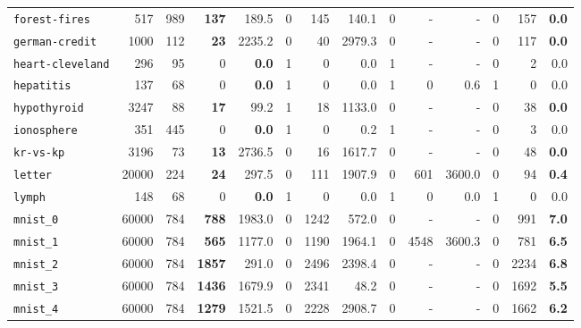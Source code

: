 \begin{tabular}{lccrrrrrrrrrrr}
\texttt{forest-fires} & \multicolumn{1}{r}{517} & \multicolumn{1}{r}{989}  & \textbf{137} & 189.5 & 0 & 145 & 140.1 & 0 & - & - & 0 & 157 & \textbf{0.0}\\
\texttt{german-credit} & \multicolumn{1}{r}{1000} & \multicolumn{1}{r}{112}  & \textbf{23} & 2235.2 & 0 & 40 & 2979.3 & 0 & - & - & 0 & 117 & \textbf{0.0}\\
\texttt{heart-cleveland} & \multicolumn{1}{r}{296} & \multicolumn{1}{r}{95}  & 0 & \textbf{0.0} & 1 & 0 & 0.0 & 1 & - & - & 0 & 2 & 0.0\\
\texttt{hepatitis} & \multicolumn{1}{r}{137} & \multicolumn{1}{r}{68}  & 0 & \textbf{0.0} & 1 & 0 & 0.0 & 1 & 0 & 0.6 & 1 & 0 & 0.0\\
\texttt{hypothyroid} & \multicolumn{1}{r}{3247} & \multicolumn{1}{r}{88}  & \textbf{17} & 99.2 & 1 & 18 & 1133.0 & 0 & - & - & 0 & 38 & \textbf{0.0}\\
\texttt{ionosphere} & \multicolumn{1}{r}{351} & \multicolumn{1}{r}{445}  & 0 & \textbf{0.0} & 1 & 0 & 0.2 & 1 & - & - & 0 & 3 & 0.0\\
\texttt{kr-vs-kp} & \multicolumn{1}{r}{3196} & \multicolumn{1}{r}{73}  & \textbf{13} & 2736.5 & 0 & 16 & 1617.7 & 0 & - & - & 0 & 48 & \textbf{0.0}\\
\texttt{letter} & \multicolumn{1}{r}{20000} & \multicolumn{1}{r}{224}  & \textbf{24} & 297.5 & 0 & 111 & 1907.9 & 0 & 601 & 3600.0 & 0 & 94 & \textbf{0.4}\\
\texttt{lymph} & \multicolumn{1}{r}{148} & \multicolumn{1}{r}{68}  & 0 & \textbf{0.0} & 1 & 0 & 0.0 & 1 & 0 & 0.0 & 1 & 0 & 0.0\\
\texttt{mnist\_0} & \multicolumn{1}{r}{60000} & \multicolumn{1}{r}{784}  & \textbf{788} & 1983.0 & 0 & 1242 & 572.0 & 0 & - & - & 0 & 991 & \textbf{7.0}\\
\texttt{mnist\_1} & \multicolumn{1}{r}{60000} & \multicolumn{1}{r}{784}  & \textbf{565} & 1177.0 & 0 & 1190 & 1964.1 & 0 & 4548 & 3600.3 & 0 & 781 & \textbf{6.5}\\
\texttt{mnist\_2} & \multicolumn{1}{r}{60000} & \multicolumn{1}{r}{784}  & \textbf{1857} & 291.0 & 0 & 2496 & 2398.4 & 0 & - & - & 0 & 2234 & \textbf{6.8}\\
\texttt{mnist\_3} & \multicolumn{1}{r}{60000} & \multicolumn{1}{r}{784}  & \textbf{1436} & 1679.9 & 0 & 2341 & 48.2 & 0 & - & - & 0 & 1692 & \textbf{5.5}\\
\texttt{mnist\_4} & \multicolumn{1}{r}{60000} & \multicolumn{1}{r}{784}  & \textbf{1279} & 1521.5 & 0 & 2228 & 2908.7 & 0 & - & - & 0 & 1662 & \textbf{6.2}\\

\end{tabular}
